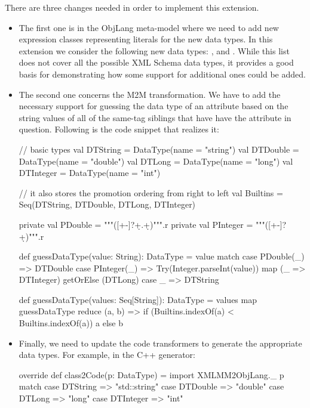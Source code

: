 There are three changes needed in order to implement this extension.
\begin{itemize}[(1)]
	\item The first one is in the ObjLang meta-model where we need to add new expression classes representing literals for the new data types.
	In this extension we consider the following new data types: ,  and .
	While this list does not cover all the possible XML Schema data types, it provides a good basis for demonstrating how some support for additional ones could be added.

	\item The second one concerns the M2M transformation.
	We have to add the necessary support for guessing the data type of an attribute based on the string values of all of the same-tag siblings that have have the attribute in question.
	Following is the code snippet that realizes it:
	\begin{scalacode}
	  // basic types
	  val DTString = DataType(name = "string")
	  val DTDouble = DataType(name = "double")
	  val DTLong = DataType(name = "long")
	  val DTInteger = DataType(name = "int")

	  // it also stores the promotion ordering from right to left
	  val Builtins = Seq(DTString, DTDouble, DTLong, DTInteger)

	  private val PDouble = """([+-]?\d+.\d+)""".r
	  private val PInteger = """([+-]?\d+)""".r

	  def guessDataType(value: String): DataType = value match {
	    case PDouble(_) => DTDouble
	    case PInteger(_) => Try(Integer.parseInt(value)) map (_ => DTInteger) getOrElse (DTLong)
	    case _ => DTString
	  }

	  def guessDataType(values: Seq[String]): DataType =
	    values map guessDataType reduce { (a, b) =>
	      if (Builtins.indexOf(a) < Builtins.indexOf(a)) a else b
	    }
	\end{scalacode}

	\item Finally, we need to update the code transformers to generate the appropriate data types.
	For example, in the C++ generator:
	\begin{scalacode}
override def class2Code(p: DataType) = {
  import XMLMM2ObjLang._
  p match {
    case DTString => "std::string"
    case DTDouble => "double"
    case DTLong => "long"
    case DTInteger => "int"
  }
}		
	\end{scalacode}
\end{itemize}

